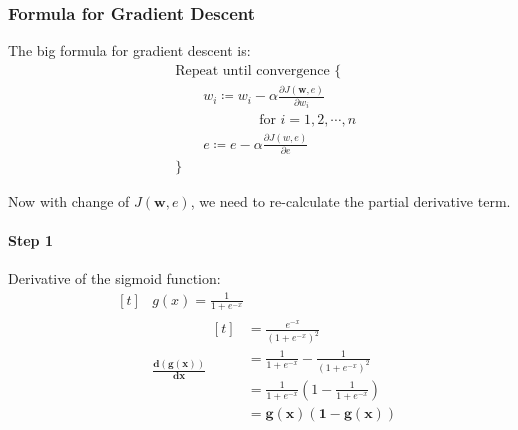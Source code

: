 \documentclass[12pt, twoside]{article}
\begin{document}
\begin{multicols*}{2}
		\subsubsection{Formula for Gradient Descent}
		The big formula for gradient descent is:
		\begin{align*}
			&\text{Repeat until convergence \{}\\
			&\qquad w_i\coloneq w_i-\alpha\frac{\partial J(\mathbf{w},e)}{\partial w_i} \\
			&\qquad\qquad\qquad\text{for }i=1,2,\cdots,n \\
			&\qquad e\coloneq e-\alpha\frac{\partial J(w,e)}{\partial e} \\
			&\text{\}}
		\end{align*}
		
		Now with change of $J(\mathbf{w},e)$, we need to re-calculate the partial derivative term\cite{derivative-of-logis}.
		
		\paragraph{Step 1} Derivative of the sigmoid function:
		$$
		\begin{aligned}[t]
			& g(x)=\frac{1}{1+e^{-x}} \\
			& \mathbf{\frac{d(g(x))}{dx}}
			\begin{aligned}[t]
				&= \frac{e^{-x}}{(1+e^{-x})^2} \\
				&= \frac{1}{1+e^{-x}}-\frac{1}{(1+e^{-x})^2} \\
				&= \frac{1}{1+e^{-x}}(1-\frac{1}{1+e^{-x}}) \\
				&= \mathbf{g(x)(1-g(x))}
			\end{aligned}
		\end{aligned}
		$$
		

\end{multicols*}
\end{document}
